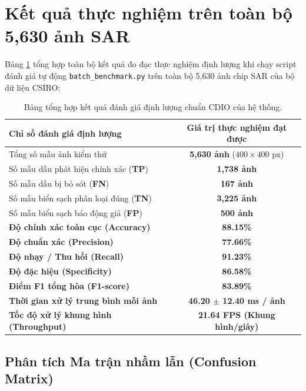 \section{Kết quả thực nghiệm trên toàn bộ 5,630 ảnh SAR}
\label{sec:benchmark_results}

Bảng \ref{tab:quantitative_results} tổng hợp toàn bộ kết quả đo đạc thực nghiệm định lượng khi chạy script đánh giá tự động \texttt{batch\_benchmark.py} trên toàn bộ 5,630 ảnh chip SAR của bộ dữ liệu CSIRO:

\begin{table}[H]
\centering
\caption{Bảng tổng hợp kết quả đánh giá định lượng chuẩn CDIO của hệ thống.}
\label{tab:quantitative_results}
\begin{tabular}{lc}
\toprule
\textbf{Chỉ số đánh giá định lượng} & \textbf{Giá trị thực nghiệm đạt được} \\
\midrule
Tổng số mẫu ảnh kiểm thử & \textbf{5,630 ảnh} ($400 \times 400$ px) \\
Số mẫu dầu phát hiện chính xác (\textbf{TP}) & \textbf{1,738 ảnh} \\
Số mẫu dầu bị bỏ sót (\textbf{FN}) & \textbf{167 ảnh} \\
Số mẫu biển sạch phân loại đúng (\textbf{TN}) & \textbf{3,225 ảnh} \\
Số mẫu biển sạch báo động giả (\textbf{FP}) & \textbf{500 ảnh} \\
\midrule
\textbf{Độ chính xác toàn cục (Accuracy)} & \textbf{88.15\%} \\
\textbf{Độ chuẩn xác (Precision)} & \textbf{77.66\%} \\
\textbf{Độ nhạy / Thu hồi (Recall)} & \textbf{91.23\%} \\
\textbf{Độ đặc hiệu (Specificity)} & \textbf{86.58\%} \\
\textbf{Điểm F1 tổng hòa (F1-score)} & \textbf{83.89\%} \\
\midrule
\textbf{Thời gian xử lý trung bình mỗi ảnh} & \textbf{46.20 $\pm$ 12.40 ms / ảnh} \\
\textbf{Tốc độ xử lý khung hình (Throughput)} & \textbf{21.64 FPS (Khung hình/giây)} \\
\bottomrule
\end{tabular}
\end{table}

\subsection{Phân tích Ma trận nhầm lẫn (Confusion Matrix)}
\label{subsec:confusion_matrix_analysis}

